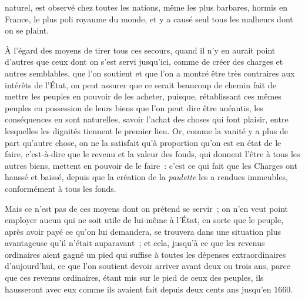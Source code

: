 \documentclass[french,twoside]{book} %
\begin{document}
naturel, est observé chez toutes les nations, même les plus barbares, hormis en France, le plus poli royaume du monde, et y a causé seul tous les malheurs dont on se plaint.\par
À l’égard des moyens de tirer tous ces secours, quand il n’y en aurait point d’autres que ceux dont on s’est servi jusqu’ici, comme de créer des charges et autres semblables, que l’on soutient et que l’on a montré être très contraires aux intérêts de l’État, on peut assurer que ce serait beaucoup de chemin fait de mettre les peuples en pouvoir de les acheter, puisque, rétablissant ces mêmes peuples en possession de leurs biens que l’on peut dire être anéantis, les conséquences en sont naturelles, savoir l’achat des choses qui font plaisir, entre lesquelles les dignités tiennent le premier lieu. Or, comme la vanité y a plus de part qu’autre chose, on ne la satisfait qu’à proportion qu’on est en état de le faire, c’est-à-dire que le revenu et la valeur des fonds, qui donnent l’être à tous les autres biens, mettent en pouvoir de le faire : c’est ce qui fait que les Charges ont haussé et baissé, depuis que la création de la {\itshape paulette} les a rendues immeubles, conformément à tous les fonds.\par
Mais ce n’est pas de ces moyens dont on prétend se servir ; on n’en veut point employer aucun qui ne soit utile de lui-même à l’État, en sorte que le peuple, après avoir payé ce qu’on lui demandera, se trouvera dans une situation plus avantageuse qu’il n’était auparavant ; et cela, jusqu’à ce que les revenus ordinaires aient gagné un pied qui suffise à toutes les dépenses extraordinaires d’aujourd’hui, ce que l’on soutient devoir arriver avant deux ou trois ans, parce que ces revenus ordinaires, étant mis sur le pied de ceux des peuples, ils hausseront avec eux comme ils avaient fait depuis deux cents ans jusqu’en 1660.\par
\end{document}
